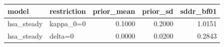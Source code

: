 \begin{tabular}{llrrr}
\toprule
model & restriction & prior\_mean & prior\_sd & sddr\_bf01 \\
\midrule
hsa\_steady & kappa\_0=0 & 0.1000 & 0.2000 & 1.0151 \\
hsa\_steady & delta=0 & 0.0000 & 0.0200 & 0.2843 \\
\bottomrule
\end{tabular}
